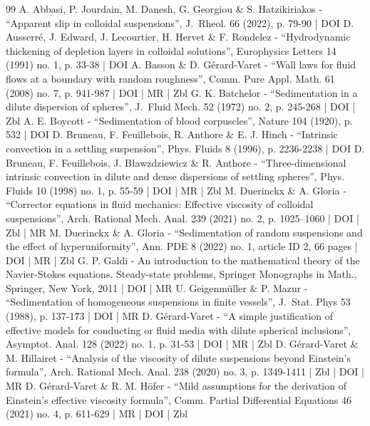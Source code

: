 \documentclass[10pt]{amsart}
\theoremstyle{plain}
\theoremstyle{definition}
\begin{document}
\begin{thebibliography}{99}
A. Abbasi, P. Jourdain, M. Danesh, G. Georgiou \& S. Hatzikiriakos - “Apparent slip in colloidal suspensions”, J. Rheol. 66 (2022), p. 79-90 | DOI
D. Ausserré, J. Edward, J. Lecourtier, H. Hervet \& F. Rondelez - “Hydrodynamic thickening of depletion layers in colloidal solutions”, Europhysics Letters 14 (1991) no. 1, p. 33-38 | DOI
A. Basson \& D. Gérard-Varet - “Wall laws for fluid flows at a boundary with random roughness”, Comm. Pure Appl. Math. 61 (2008) no. 7, p. 941-987 | DOI | MR | Zbl
G. K. Batchelor - “Sedimentation in a dilute dispersion of spheres”, J. Fluid Mech. 52 (1972) no. 2, p. 245-268 | DOI | Zbl
A. E. Boycott - “Sedimentation of blood corpuscles”, Nature 104 (1920), p. 532 | DOI
D. Bruneau, F. Feuillebois, R. Anthore \& E. J. Hinch - “Intrinsic convection in a settling suspension”, Phys. Fluids 8 (1996), p. 2236-2238 | DOI
D. Bruneau, F. Feuillebois, J. Bławzdziewicz \& R. Anthore - “Three-dimensional intrinsic convection in dilute and dense dispersions of settling spheres”, Phys. Fluids 10 (1998) no. 1, p. 55-59 | DOI | MR | Zbl
M. Duerinckx \& A. Gloria - “Corrector equations in fluid mechanics: Effective viscosity of colloidal suspensions”, Arch. Rational Mech. Anal. 239 (2021) no. 2, p. 1025–1060 | DOI | Zbl | MR
M. Duerinckx \& A. Gloria - “Sedimentation of random suspensions and the effect of hyperuniformity”, Ann. PDE 8 (2022) no. 1, article ID 2, 66 pages | DOI | MR | Zbl
G. P. Galdi - An introduction to the mathematical theory of the Navier-Stokes equations. Steady-state problems, Springer Monographs in Math., Springer, New York, 2011 | DOI | MR
U. Geigenmüller \& P. Mazur - “Sedimentation of homogeneous suspensions in finite vessels”, J. Stat. Phys 53 (1988), p. 137-173 | DOI | MR
D. Gérard-Varet - “A simple justification of effective models for conducting or fluid media with dilute spherical inclusions”, Asymptot. Anal. 128 (2022) no. 1, p. 31-53 | DOI | MR | Zbl
D. Gérard-Varet \& M. Hillairet - “Analysis of the viscosity of dilute suspensions beyond Einstein’s formula”, Arch. Rational Mech. Anal. 238 (2020) no. 3, p. 1349-1411 | Zbl | DOI | MR
D. Gérard-Varet \& R. M. Höfer - “Mild assumptions for the derivation of Einstein’s effective viscosity formula”, Comm. Partial Differential Equations 46 (2021) no. 4, p. 611-629 | MR | DOI | Zbl

\end{thebibliography}
\end{document}
